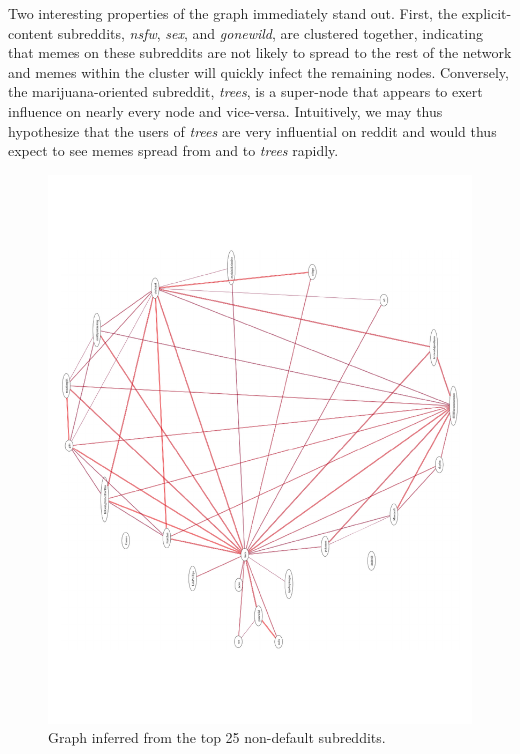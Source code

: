 \documentclass{article} %
\begin{document}
Two interesting properties of the graph immediately stand out. First, the explicit-content subreddits, \textit{nsfw}, \textit{sex}, and \textit{gonewild}, are clustered together, indicating that memes on these subreddits are not likely to spread to the rest of the network and memes within the cluster will quickly infect the remaining nodes. Conversely, the marijuana-oriented subreddit, \textit{trees}, is a super-node that appears to exert influence on nearly every node and vice-versa. Intuitively, we may thus hypothesize that the users of \textit{trees} are very influential on reddit and would thus expect to see memes spread from and to \textit{trees} rapidly.

\begin{figure}[htb]
\centering
\includegraphics[width=\textwidth]{reddit.pdf}
\caption{Graph inferred from the top 25 non-default subreddits.}
\label{fig:reddit}
\end{figure}
\end{document}
